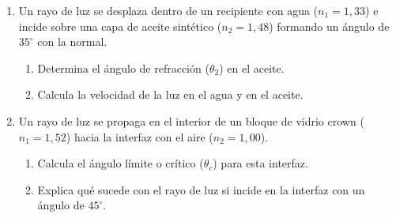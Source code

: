 \documentclass[11pt, letterpaper]{article}
\newif\ifshowanswers
\newcommand{\answer}[1]{ 
	\ifshowanswers 
	\par\vspace{0.15cm} 
	\begin{tcolorbox}[colback=blue!5!white, colframe=blue!60!white, arc=1mm, boxrule=0.5pt, title=\textbf{\footnotesize SOLUCIÓN PASO A PASO (DOCENTE)}] 
		\color{blue!80!black}\footnotesize #1 
	\end{tcolorbox} 
	\par\vspace{0.15cm} 
	\else 
	\par\vspace{0.3cm} 
	\fi 
}
\begin{document}
\begin{enumerate}[leftmargin=*, itemsep=0.8cm]
		\item  Un rayo de luz se desplaza dentro de un recipiente con agua ($n_1 = 1,33$) e incide sobre una capa de aceite sintético ($n_2 = 1,48$) formando un ángulo de $35^\circ$ con la normal. 
		\begin{enumerate}[label=\alph*), itemsep=0.2cm] 
			\item Determina el ángulo de refracción ($\theta_2$) en el aceite. 
			\item Calcula la velocidad de la luz en el agua y en el aceite. 
		\end{enumerate} 
		\answer{ 
			a) $n_1 \sin\theta_1 = n_2 \sin\theta_2 \implies 1,33 \cdot \sin(35^\circ) = 1,48 \cdot \sin\theta_2$.\\ 
			$\sin\theta_2 = \frac{1,33 \cdot 0,5736}{1,48} \approx 0,5155 \implies \theta_2 = \arcsin(0,5155) \approx \mathbf{31,03^\circ}$.\\[0.1cm] 
			b) Velocidad en agua: $v_{\text{agua}} = \frac{3 \times 10^8}{1,33} \approx \mathbf{2,26 \times 10^8\text{ m/s}}$.\\ 
			Velocidad en aceite: $v_{\text{aceite}} = \frac{3 \times 10^8}{1,48} \approx \mathbf{2,03 \times 10^8\text{ m/s}}$. 
		} 
		
		\item  Un rayo de luz se propaga en el interior de un bloque de vidrio crown ($n_1 = 1,52$) hacia la interfaz con el aire ($n_2 = 1,00$). 
		\begin{enumerate}[label=\alph*), itemsep=0.2cm] 
			\item Calcula el ángulo límite o crítico ($\theta_c$) para esta interfaz. 
			\item Explica qué sucede con el rayo de luz si incide en la interfaz con un ángulo de $45^\circ$. 
		\end{enumerate} 
		\answer{ 
			a) Condición para el ángulo crítico ($\theta_2 = 90^\circ$): $n_1 \sin\theta_c = n_2 \sin(90^\circ)$.\\ 
			$\sin\theta_c = \frac{1,00}{1,52} \approx 0,6579 \implies \theta_c = \arcsin(0,6579) \approx \mathbf{41,14^\circ}$.\\[0.1cm] 
			b) Como el ángulo de incidencia ($45^\circ$) es mayor que el ángulo crítico ($\theta_c \approx 41,14^\circ$), no se produce refracción hacia el aire; la luz experimenta una \textbf{reflexión interna total}. 
		} 
		

\end{enumerate}
\end{document}
